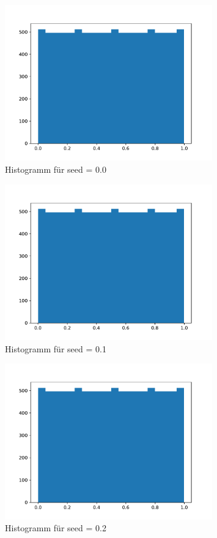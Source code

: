 \begin{figure}[H]
  \centering
  \includegraphics[width=0.8\textwidth]{nr8_c_seed=0.0.pdf}
  \caption{Histogramm für seed = 0.0}
\end{figure}

\begin{figure}[H]
  \centering
  \includegraphics[width=0.8\textwidth]{nr8_c_seed=0.1.pdf}
  \caption{Histogramm für seed = 0.1}
\end{figure}

\begin{figure}[H]
  \centering
  \includegraphics[width=0.8\textwidth]{nr8_c_seed=0.2.pdf}
  \caption{Histogramm für seed = 0.2}
\end{figure}

